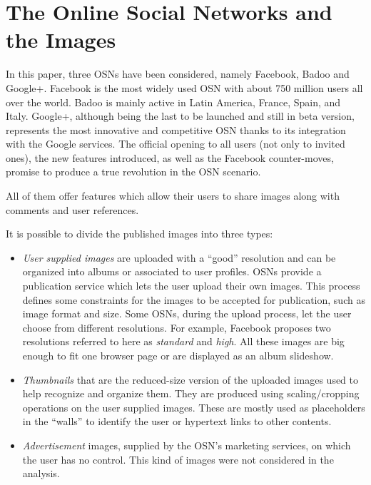 \documentclass[10pt, conference]{IEEEtran}
\begin{document}
\section{The Online Social Networks and the Images}
\label{sec1}
In this paper, three OSNs have been considered, namely Facebook, Badoo and Google+. 
Facebook is the most widely used OSN with about 750 million users all over the world.
Badoo is mainly active in Latin America, France, Spain, and Italy\cite{gtrend}. Google+, although being the last to be launched and still in beta version, represents the most innovative and competitive OSN thanks to its integration with the Google services. The official opening to all users (not only to invited ones), the new features introduced, as well as the Facebook counter-moves, promise to produce a true revolution in the OSN scenario.

All of them offer features which allow their users to share images along with comments and user references.

It is possible to divide the published images into three types:
\begin{itemize}
\item {\sl User supplied images} are uploaded with a ``good'' resolution and can be organized into albums or associated to user profiles. OSNs provide a publication service which lets the user upload their own images. This process defines some constraints for the images to be accepted for publication, such as image format and size.
Some OSNs, during the upload process, let the user choose from different resolutions. For example, Facebook proposes two resolutions referred to here as {\sl standard} and {\sl high}. All these images are big enough to fit one browser page or are displayed as an album slideshow.

\item {\sl Thumbnails} that are the reduced-size version of the uploaded images used to help  recognize and organize them. They are produced using scaling/cropping operations on the user supplied images. These are mostly used as placeholders in the ``walls'' to identify the user or hypertext links to other contents.

\item {\sl Advertisement} images, supplied by the OSN's marketing services, on which the user has no control. This kind of images were not considered in the analysis.
\end{itemize}
\end{document}
